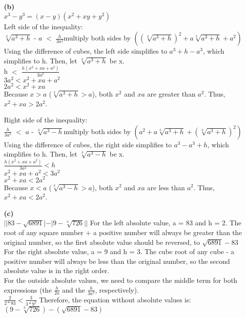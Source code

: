 \documentclass{beamer}     %
\begin{document}
\textbf{(b)}\\
$x^3 - y^3 = (x-y)(x^2 + xy + y^2)$\\
Left side of the inequality: \\
$\sqrt[3]{a^3 + h}$ - $a$ $<$ $\frac{h}{3a^2}$\hfill multiply both sides by $((\sqrt[3]{a^3 + h})^2 + a\sqrt[3]{a^3 + h} + a^2)$\\
Using the difference of cubes, the left side simplifies to $a^3 + h - a^3$, which simplifies to h. Then, let $\sqrt[3]{a^3+h}$ be x.\\
h $<$ $\frac{h(x^2 + xa + a^2)}{3a^2}$ \\
$3a^2 < x^2 + xa + a^2$\\
$2a^2 < x^2 + xa$\\
Because $x > a$ ($\sqrt[3]{a^3 + h} > a $), both $x^2$ and $xa$ are greater than $a^2$. Thus, $x^2 + xa > 2a^2$.

Right side of the inequality: \\ 
$\frac{h}{3a^2}$ $<$ $a$ - $\sqrt[3]{a^3 - h}$\hfill multiply both sides by $(a^2 + a\sqrt[3]{a^3 + h} + (\sqrt[3]{a^3 + h})^2)$\\
Using the difference of cubes, the right side simplifies to $a^3 - a^3 + h$, which simplifies to h. Then, let $\sqrt[3]{a^3-h}$ be x.\\
$\frac{h(x^2 + xa + a^2)}{3a^2} < h$\\
$x^2 + xa + a^2 < 3a^2$\\
$x^2 + xa < 2a^2$\\
Because $x < a$ ($\sqrt[3]{a^3 - h} > a $), both $x^2$ and $xa$ are less than $a^2$. Thus, $x^2 + xa < 2a^2$.

\textbf{(c)}\\
$||83 - \sqrt{6891}| - |9 - \sqrt[3]{726}||$
For the left absolute value, a = 83 and h = 2. The root of any square number + a positive number will always be greater than the original number, so the first absolute value should be reversed, to $\sqrt{6891} - 83$\\
For the right absolute value, a = 9 and h = 3. The cube root of any cube - a positive number will always be less than the original number, so the second absolute value is in the right order.\\
For the outside absolute values, we need to compare the middle term for both expressions (the $\frac{h}{2a}$ and the $\frac{h}{3a^2}$, respectively). \\
$\frac{2}{2*83} < \frac{3}{3*9^2}$
Therefore, the equation without absolute values is:\\
$(9-\sqrt[3]{726})-(\sqrt{6891} - 83)$
\end{document}
